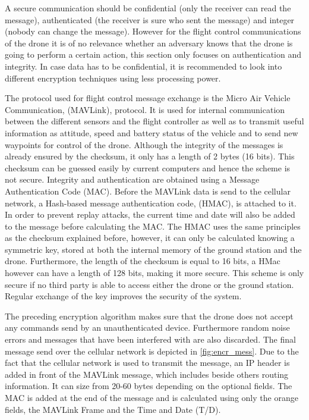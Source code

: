 A secure communication should be confidential (only the receiver can read the message), authenticated (the receiver is sure who sent the message) and integer (nobody can change the message). However for the flight control communications of the drone it is of no relevance whether an adversary knows that the drone is going to perform a certain action, this section only focuses on authentication and integrity. In case data has to be confidential, it is recommended to look into different encryption techniques using less processing power. 

The protocol used for flight control message exchange is the Micro Air Vehicle Communication, (MAVLink), protocol. It is used for internal communication between the different sensors and the flight controller as well as to transmit useful information as attitude, speed and battery status of the vehicle and to send new waypoints for control of the drone. Although the integrity of the messages is already ensured by the checksum, it only has a length of 2 bytes (16 bits). This checksum can be guessed easily by current computers and hence the scheme is not secure.
Integrity and authentication are obtained using a Message Authentication Code (MAC). Before the MAVLink data is send to the cellular network, a Hash-based message authentication code, (HMAC), is attached to it. In order to prevent replay attacks, the current time and date will also be added to the message before calculating the MAC. The HMAC uses the same principles as the checksum explained before, however, it can only be calculated knowing a symmetric key, stored at both the internal memory of the ground station and the drone.  Furthermore, the length of the checksum is equal to 16 bits, a HMac however can have a length of 128 bits, making it more secure. This scheme is only secure if no third party is able to access either the drone or the ground station. Regular exchange of the key improves the security of the system.


The preceding encryption algorithm makes sure that the drone does not accept any commands send by an unauthenticated device. Furthermore random noise errors and messages that have been interfered with are also discarded. The final message send over the cellular network is depicted in \autoref{fig:encr_mess}. Due to the fact that the cellular network is used to transmit the message, an IP header is added in front of the MAVLink message, which includes beside others routing information. It can size from 20-60 bytes depending on the optional fields. The MAC is added at the end of the message and is calculated using only the orange fields, the MAVLink Frame and the Time and Date (T/D).

